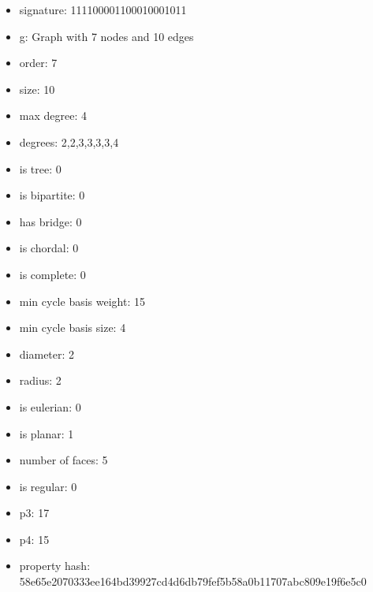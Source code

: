 \begin{itemize}
\item signature: 111100001100010001011
\item g: Graph with 7 nodes and 10 edges
\item order: 7
\item size: 10
\item max degree: 4
\item degrees: 2,2,3,3,3,3,4
\item is tree: 0
\item is bipartite: 0
\item has bridge: 0
\item is chordal: 0
\item is complete: 0
\item min cycle basis weight: 15
\item min cycle basis size: 4
\item diameter: 2
\item radius: 2
\item is eulerian: 0
\item is planar: 1
\item number of faces: 5
\item is regular: 0
\item p3: 17
\item p4: 15
\item property hash: 58e65e2070333ee164bd39927cd4d6db79fef5b58a0b11707abc809e19f6e5c0
\end{itemize}
\newpage
\begin{figure}
\end{figure}
